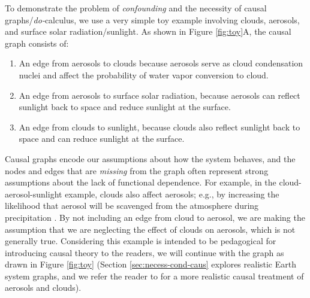 \documentclass[12pt]{article}
\begin{document}
To demonstrate the problem of \textit{confounding} and the necessity
of causal graphs/\textit{do-}calculus, we use a very simple toy
example involving clouds, aerosols, and surface solar
radiation/sunlight. As shown in Figure \ref{fig:toy}A, the causal
graph consists of:

\begin{enumerate}
\item An edge from aerosols to clouds because aerosols serve as cloud
  condensation nuclei and affect the probability of water vapor
  conversion to cloud.
\item An edge from aerosols to surface solar radiation, because
  aerosols can reflect sunlight back to space and reduce sunlight at
  the surface.
\item An edge from clouds to sunlight, because clouds also reflect
  sunlight back to space and can reduce sunlight at the surface.
\end{enumerate}

Causal graphs encode our assumptions about how the system behaves, and
the nodes and edges that are \textit{missing} from the graph often
represent strong assumptions about the lack of functional
dependence. For example, in the cloud-aerosol-sunlight example, clouds
also affect aerosols; e.g., by increasing the likelihood that aerosol
will be scavenged from the atmosphere during precipitation
\citep[e.g.,][]{radke-scavenge-1980, jurado2008,
  blanco-alegre2018}. By not including an edge from cloud to aerosol,
we are making the assumption that we are neglecting the effect of
clouds on aerosols, which is not generally true. Considering this
example is intended to be pedagogical for introducing causal theory to
the readers, we will continue with the graph as drawn in Figure
\ref{fig:toy} (Section \ref{sec:necess-cond-caus} explores realistic
Earth system graphs, and we refer the reader to \cite{gryspeerdt-2019}
for a more realistic causal treatment of aerosols and clouds).

\end{document}
